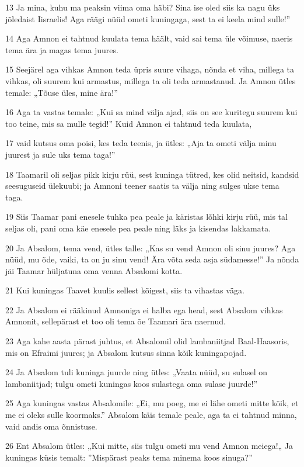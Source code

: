 \par 13 Ja mina, kuhu ma peaksin viima oma häbi? Sina ise oled siis ka nagu üks jõledaist Iisraelis! Aga räägi nüüd ometi kuningaga, sest ta ei keela mind sulle!”
\par 14 Aga Amnon ei tahtnud kuulata tema häält, vaid sai tema üle võimuse, naeris tema ära ja magas tema juures.
\par 15 Seejärel aga vihkas Amnon teda üpris suure vihaga, nõnda et viha, millega ta vihkas, oli suurem kui armastus, millega ta oli teda armastanud. Ja Amnon ütles temale: „Tõuse üles, mine ära!”
\par 16 Aga ta vastas temale: „Kui sa mind välja ajad, siis on see kuritegu suurem kui too teine, mis sa mulle tegid!” Kuid Amnon ei tahtnud teda kuulata,
\par 17 vaid kutsus oma poisi, kes teda teenis, ja ütles: „Aja ta ometi välja minu juurest ja sule uks tema taga!”
\par 18 Taamaril oli seljas pikk kirju rüü, sest kuninga tütred, kes olid neitsid, kandsid seesuguseid ülekuubi; ja Amnoni teener saatis ta välja ning sulges ukse tema taga.
\par 19 Siis Taamar pani enesele tuhka pea peale ja käristas lõhki kirju rüü, mis tal seljas oli, pani oma käe enesele pea peale ning läks ja kisendas lakkamata.
\par 20 Ja Absalom, tema vend, ütles talle: „Kas su vend Amnon oli sinu juures? Aga nüüd, mu õde, vaiki, ta on ju sinu vend! Ära võta seda asja südamesse!” Ja nõnda jäi Taamar hüljatuna oma venna Absalomi kotta.
\par 21 Kui kuningas Taavet kuulis sellest kõigest, siis ta vihastas väga.
\par 22 Ja Absalom ei rääkinud Amnoniga ei halba ega head, sest Absalom vihkas Amnonit, sellepärast et too oli tema õe Taamari ära naernud.
\par 23 Aga kahe aasta pärast juhtus, et Absalomil olid lambaniitjad Baal-Haasoris, mis on Efraimi juures; ja Absalom kutsus sinna kõik kuningapojad.
\par 24 Ja Absalom tuli kuninga juurde ning ütles: „Vaata nüüd, su sulasel on lambaniitjad; tulgu ometi kuningas koos sulastega oma sulase juurde!”
\par 25 Aga kuningas vastas Absalomile: „Ei, mu poeg, me ei lähe ometi mitte kõik, et me ei oleks sulle koormaks.” Absalom käis temale peale, aga ta ei tahtnud minna, vaid andis oma õnnistuse.
\par 26 Ent Absalom ütles: „Kui mitte, siis tulgu ometi mu vend Amnon meiega!„ Ja kuningas küsis temalt: ”Mispärast peaks tema minema koos sinuga?”
